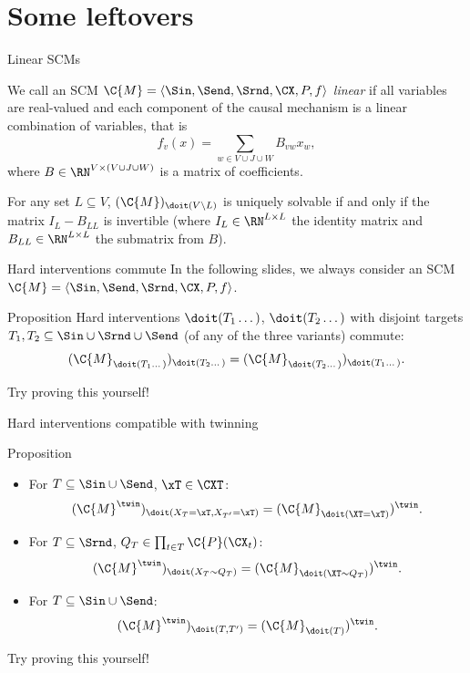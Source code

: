 \part{Some leftovers}
\frame{\partpage}

\begin{frame}{Linear SCMs}
  \begin{Def}
We call an SCM $\C{M}=\langle \Sin, \Send, \Srnd, \CX, P, f \rangle$
\emph{linear} if all variables are real-valued and
each component of the causal mechanism is a linear combination of variables, that is
$$
  f_v(x) = \sum_{w\in V \cup J \cup W} B_{vw} x_w,
$$
where $B\in\RN^{V \times (V \cup J \cup W)}$ is a matrix of coefficients.
  \end{Def}

For any set $L \subseteq V$,
$(\C{M})_{\doit(V\setminus L)}$ is uniquely solvable if and only if the matrix $I_{L}-B_{LL}$ is invertible
(where $I_L \in \RN^{L \times L}$ the identity matrix and $B_{LL} \in \RN^{L \times L}$ the submatrix from $B$).
\end{frame}

\begin{frame}{Hard interventions commute}
In the following slides, we always consider an SCM
$\C{M} = \langle \Sin, \Send, \Srnd, \CX, P, f \rangle$.

\begin{block}{Proposition}
Hard interventions $\doit(T_1\dots)$, $\doit(T_2\dots)$ with disjoint targets $T_1, T_2 \subseteq \Sin \cup \Srnd \cup \Send$ (of any of the three variants) commute:
  $$(\C{M}_{\doit(T_1\dots)})_{\doit(T_2\dots)} = (\C{M}_{\doit(T_2\dots)})_{\doit(T_1\dots)}.$$
\end{block}
Try proving this yourself!
\end{frame}

\begin{frame}{Hard interventions compatible with twinning}
\begin{block}{Proposition}
\begin{itemize}
  \item For $T \subseteq \Sin \cup \Send$, $\xT \in \CXT$:
    $$(\C{M}^\twin)_{\doit(X_T=\xT,X_{T'}=\xT)} = (\C{M}_{\doit(\XT=\xT)})^\twin.$$
  \item For $T \subseteq \Srnd$, $Q_T \in \prod_{t\in T} \C{P}(\CX_t)$:
    $$(\C{M}^\twin)_{\doit(X_T\sim Q_T)} = (\C{M}_{\doit(\XT\sim Q_T)})^\twin.$$
  \item For $T \subseteq \Sin \cup \Send$:
    $$(\C{M}^\twin)_{\doit(T,T')} = (\C{M}_{\doit(T)})^\twin.$$
\end{itemize}
\end{block}
Try proving this yourself!
\end{frame}

